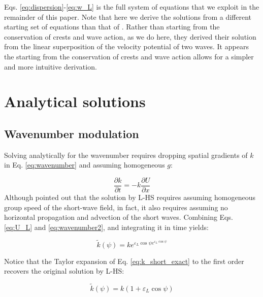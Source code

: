 \documentclass[draft]{agujournal2019}
\begin{document}
Eqs. \ref{eq:dispersion}-\ref{eq:w_L} is the full system of equations that we
exploit in the remainder of this paper.
Note that here we derive the solutions from a different starting set of
equations than that of .
Rather than starting from the conservation of crests and wave action, as we do
here, they derived their solution from the linear superposition of the velocity
potential of two waves.
It appears the starting from the conservation of crests and wave action allows
for a simpler and more intuitive derivation.

\section{Analytical solutions}
\label{section:analytical_solutions}

\subsection{Wavenumber modulation}
\label{subsection:wavenumber_modulation}

Solving analytically for the wavenumber requires dropping spatial gradients of
$k$ in Eq. \ref{eq:wavenumber} and assuming homogeneous $g$:

\begin{equation}
\label{eq:wavenumber2}
\dfrac{\partial k}{\partial t}
= - k \dfrac{\partial U}{\partial x}
\end{equation}
Although  pointed out that the solution by L-HS
requires assuming homogeneous group speed of the short-wave field, in fact,
it also requires assuming no horizontal propagation and advection of the short
waves.
Combining Eqs. \ref{eq:U_L} and \ref{eq:wavenumber2}, and integrating it in time
yields:

\begin{equation}
\label{eq:k_short_exact}
\widetilde{k}(\psi) = k e^{\varepsilon_L \cos{\psi} e^{\varepsilon_L \cos{\psi}}}
\end{equation}

Notice that the Taylor expansion of Eq. \ref{eq:k_short_exact} to the first order
recovers the original solution by L-HS:

\begin{equation}
\label{eq:k_short_lhs}
\widetilde{k}(\psi) = k (1 + \varepsilon_L \cos{\psi})
\end{equation}
\end{document}
